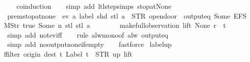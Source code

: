 \begin{isabellebody}
\ \ \isamarkupfalse%
\ {\isacharparenleft}coinduction{\isacharparenright}\isanewline
\ \ \isamarkupfalse%
\ {\isacharparenleft}simp\ add{\isacharcolon}\ ltl{\isacharunderscore}step{\isachardot}simps\ stop{\isacharunderscore}at{\isacharunderscore}None{\isacharparenright}%
\endisatagproof
{\isafoldproof}%
%
\isadelimproof
\isanewline
%
\endisadelimproof
\isanewline
{}\isamarkupfalse%
\ prem{\isacharunderscore}stop{\isacharunderscore}at{\isacharunderscore}none{\isacharcolon}\ {\isachardoublequoteopen}{\isasymnot}\ ev\ {\isacharparenleft}{\isasymlambda}a{\isachardot}\ label\ {\isacharparenleft}shd\ {\isacharparenleft}stl\ a{\isacharparenright}{\isacharparenright}\ {\isacharequal}\ STR\ {\isacharprime}{\isacharprime}opendoor{\isacharprime}{\isacharprime}\ {\isasymand}\ output{\isacharunderscore}eq\ {\isacharbrackleft}Some\ {\isacharparenleft}EFSM{\isachardot}Str\ {\isacharprime}{\isacharprime}true{\isacharprime}{\isacharprime}{\isacharparenright}{\isacharcomma}\ Some\ n{\isacharbrackright}\ {\isacharparenleft}stl\ {\isacharparenleft}stl\ a{\isacharparenright}{\isacharparenright}{\isacharparenright}\isanewline
\ \ \ \ \ \ \ \ {\isacharparenleft}make{\isacharunderscore}full{\isacharunderscore}observation\ lift\ None\ r\ {\isacharbrackleft}{\isacharbrackright}\ t{\isacharparenright}{\isachardoublequoteclose}\isanewline
%
\isadelimproof
\ \ %
\endisadelimproof
%
\isatagproof
{}\isamarkupfalse%
\ {\isacharparenleft}simp\ add{\isacharcolon}\ not{\isacharunderscore}ev{\isacharunderscore}iff{\isacharparenright}\isanewline
\ \ \isamarkupfalse%
\ {\isacharparenleft}rule\ alw{\isacharunderscore}mono{\isacharbrackleft}of\ {\isachardoublequoteopen}alw\ {\isacharparenleft}output{\isacharunderscore}eq\ {\isacharbrackleft}{\isacharbrackright}{\isacharparenright}{\isachardoublequoteclose}{\isacharbrackright}{\isacharparenright}\isanewline
\ \ \ \isamarkupfalse%
\ {\isacharparenleft}simp\ add{\isacharcolon}\ no{\isacharunderscore}output{\isacharunderscore}none{\isacharunderscore}if{\isacharunderscore}empty{\isacharparenright}\isanewline
\ \ \isamarkupfalse%
\ fastforce%
\endisatagproof
{\isafoldproof}%
%
\isadelimproof
\isanewline
%
\endisadelimproof
\isanewline
{}\isamarkupfalse%
\ label{\isacharunderscore}up{\isacharcolon}\isanewline
{\isachardoublequoteopen}ffilter\ {\isacharparenleft}{\isasymlambda}{\isacharparenleft}{\isacharparenleft}origin{\isacharcomma}\ dest{\isacharparenright}{\isacharcomma}\ t{\isacharparenright}{\isachardot}\ Label\ t\ {\isacharequal}\ STR\ {\isacharprime}{\isacharprime}up{\isacharprime}{\isacharprime}{\isacharparenright}\ lift\ {\isacharequal}\ {\isacharbraceleft}{\isacharbar}\isanewline

\end{isabellebody}
